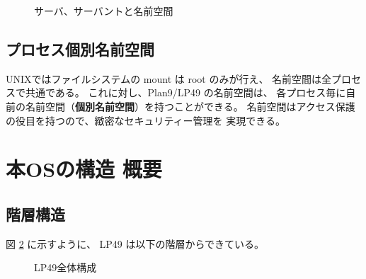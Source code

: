 \documentclass{jarticle}
\begin{document}
\begin{figure}[htb]
  \begin{center}
   \epsfxsize=400pt
    \caption{サーバ、サーバントと名前空間}
    \label{fig:NS-server-servant}
  \end{center}
\end{figure}



\subsection{プロセス個別名前空間}

  UNIXではファイルシステムの mount は root のみが行え、
  名前空間は全プロセスで共通である。
  これに対し、Plan9/LP49 の名前空間は、
  各プロセス毎に自前の名前空間（{\bf 個別名前空間}）を持つことができる。
  名前空間はアクセス保護の役目を持つので、緻密なセキュリティー管理を
  実現できる。



\section{本OSの構造 概要}\label{sec:ITEM}

\subsection{階層構造}
      図 \ref{fig:LP49general} に示すように、
  LP49 は以下の階層からできている。
    
\begin{figure}[htb]
  \begin{center}
   \epsfxsize=400pt
    \caption{LP49全体構成}
    \label{fig:LP49general}
  \end{center}
\end{figure}
\end{document}
